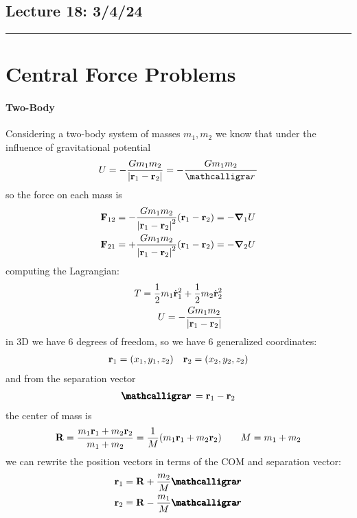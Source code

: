 \documentclass[../main.tex]{subfiles}
\begin{document}
\subsection*{Lecture 18: \hfill  3/4/24}
\hrule \vspace{10px}
\section{Central Force Problems}

\paragraph*{Two-Body} Considering a two-body system of masses $m_1, m_2$ we know that under the
influence of gravitational potential
\begin{align*}
    U = -\frac{G m_1 m_2}{\abs{\vb r_1 - \vb r_2}} = -\frac{G m_1 m_2}{\scriptr}
\end{align*}
so the force on each mass is
\begin{align*}
    \vb F_{12} &= -\frac{G m_1 m_2}{\abs{\vb r_1 - \vb r_2}^2} (\vb r_1 - \vb r_2) = -\grad_1 U \\
    \vb F_{21} &= +\frac{G m_1 m_2}{\abs{\vb r_1 - \vb r_2}^2} (\vb r_1 - \vb r_2) = -\grad_2 U
\end{align*}
computing the Lagrangian:
\begin{align*}
    T = \frac{1}{2} m_1 \dot {\vb r}_1^2 + \frac{1}{2} m_2 \dot {\vb r}_2^2 \\
    U = -\frac{G m_1 m_2}{\abs{\vb r_1 - \vb r_2}}
\end{align*}
in 3D we have 6 degrees of freedom, so we have 6 generalized coordinates:
\begin{align*}
    \vb r_1 = (x_1, y_1, z_2) \quad \vb r_2 = (x_2, y_2, z_2)
\end{align*}
and from the separation vector
\begin{align*}
    \boldscriptr = \vb r_1 - \vb r_2
\end{align*}
the center of mass is
\begin{align*}
    \vb R = \frac{m_1 \vb r_1 + m_2 \vb r_2}{m_1 + m_2} = \frac{1}{M} (m_1 \vb r_1 + m_2 \vb r_2) 
    \qquad M = m_1 + m_2
\end{align*}
we can rewrite the position vectors in terms of the COM and separation vector:
\begin{align*}
    \vb r_1 &= \vb R + \frac{m_2}{M} \boldscriptr \\
    \vb r_2 &= \vb R - \frac{m_1}{M} \boldscriptr
\end{align*}
\end{document}
